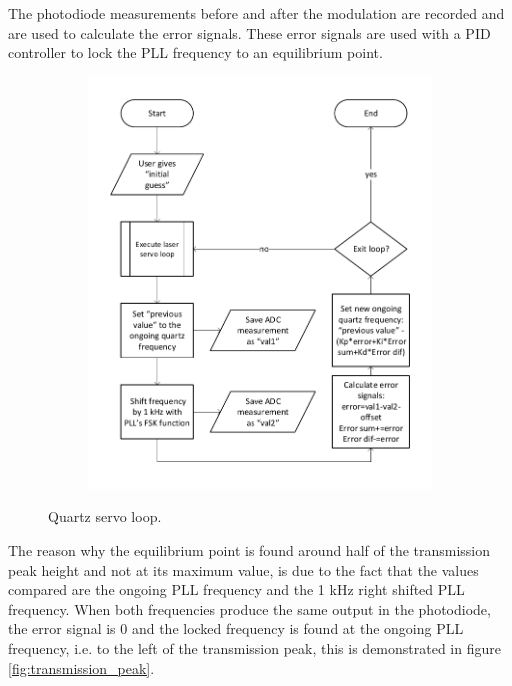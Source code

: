 \documentclass[a4paper,12pt]{article}
\newcounter{step}
\begin{document}
The photodiode measurements before and after the modulation are recorded and are used to calculate the error signals. These error signals are used with a PID controller to lock the PLL frequency to an equilibrium point.

\begin{figure}[!h]
\centering
\begin{subfigure}[c]{0.49\textwidth}
	\centering
	\captionsetup{justification=centering}
\end{subfigure}
\hfill
\begin{subfigure}[c]{0.49\textwidth}
	\centering
	\includegraphics[width=\textwidth]{Images/Quartz_Servo_loop_flowchart.pdf}
	\captionsetup{justification=centering}
\end{subfigure}
 \caption{Quartz servo loop.}
\label{fig:quartz_servo_loop}
\end{figure}

The reason why the equilibrium point is found around half of the transmission peak height and not at its maximum value, is due to the fact that the values compared are the ongoing PLL frequency and the 1 kHz right shifted PLL frequency. When both frequencies produce the same output in the photodiode, the error signal is 0 and the locked frequency is found at the ongoing PLL frequency, i.e. to the left of the transmission peak, this is demonstrated in figure \ref{fig:transmission_peak}.
\end{document}
